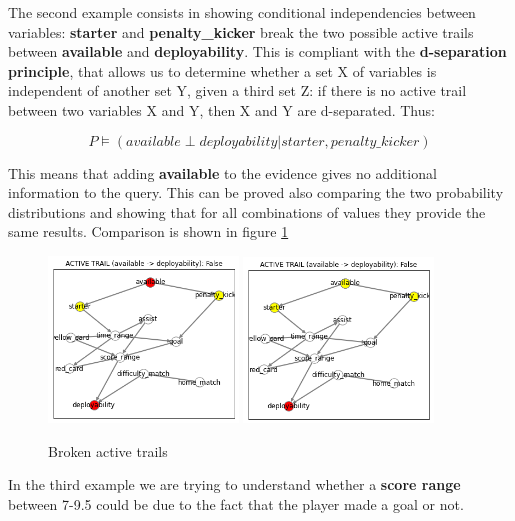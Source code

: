 \documentclass[a4paper,10pt]{report}
\begin{document}
The second example consists in showing conditional independencies between variables: \textbf{starter} and \textbf{penalty_kicker} break the two possible active trails between \textbf{available} and \textbf{deployability}. This is compliant with the \textbf{d-separation principle}, that allows us to determine whether a set X of variables is independent of another set Y, given a third set Z: if there is no active trail between two variables X and Y, then X and Y are d-separated. Thus:

\begin{center}
    \[P \models (available \perp deployability|starter,penalty\_kicker)\]
\end{center}

This means that adding \textbf{available} to the evidence gives no additional information to the query. This can be proved also comparing the two probability distributions and showing that for all combinations of values they provide the same results.
Comparison is shown in figure \ref{fig:broken_trails}

\begin{figure}[h]
    \centering
    \includegraphics[width=0.45\textwidth]{assets/img/active_trail_2-1.PNG}
    \includegraphics[width=0.45\textwidth]{assets/img/active_trail_2-2.PNG}
    \caption{Broken active trails}
    \label{fig:broken_trails}
\end{figure}


In the third example we are trying to understand whether a \textbf{score range} between 7-9.5 could be due to the fact that the player made a goal or not.
\end{document}
